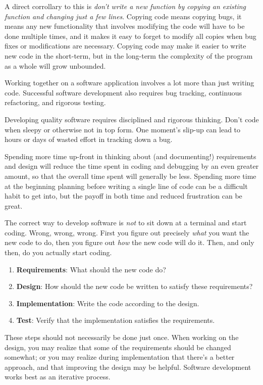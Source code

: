 \documentclass{article}
\begin{document}
A direct corrollary to this is \textit{don't write a new function by
copying an existing function and changing just a few lines}.  Copying
code means copying bugs, it means any new functionality that involves
modifying the code will have to be done multiple times, and it makes
it easy to forget to modify all copies when bug fixes or modifications
are necessary.  Copying code may make it easier to write new code in
the short-term, but in the long-term the complexity of the program as
a whole will grow unbounded.

Working together on a software application involves a lot more than
just writing code.  Successful software development also requires bug
tracking, continuous refactoring, and rigorous testing.

Developing quality software requires disciplined and rigorous
thinking.  Don't code when sleepy or otherwise not in top form.  One
moment's slip-up can lead to hours or days of wasted effort in
tracking down a bug.  

Spending more time up-front in thinking about (and documenting!) 
requirements and design will reduce the time spent in coding and
debugging by an even greater amount, so that the overall time spent
will generally be less.  Spending more time at the beginning planning
before writing a single line of code can be a difficult habit to get
into, but the payoff in both time and reduced frustration can be
great.

The correct way to develop software is \textit{not} to sit down at a
terminal and start coding.  Wrong, wrong, wrong.  First you figure out
precisely \textit{what} you want the new code to do, then you figure
out \textit{how} the new code will do it.  Then, and only then, do you
actually start coding.

\begin{enumerate}
\item \textbf{Requirements}: What should the new code do?
\item \textbf{Design}: How should the new code be written to satisfy these requirements?
\item \textbf{Implementation}: Write the code according to the design.
\item \textbf{Test}: Verify that the implementation satisfies the requirements.
\end{enumerate}

These steps should not necessarily be done just once.  When working on
the design, you may realize that some of the requirements should be
changed somewhat; or you may realize during implementation that
there's a better approach, and that improving the design may be
helpful.  Software development works best as an iterative process.
\end{document}
